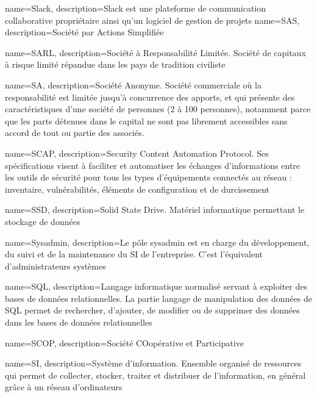 {
    name=Slack,
    description={Slack est une plateforme de communication collaborative propriétaire ainsi qu'un logiciel de gestion de projets}
}
{
    name=SAS,
    description={Société par Actions Simplifiée}
}

{
    name=SARL,
    description={Société à Responsabilité Limitée. Société de capitaux à risque limité répandue dans les pays de tradition civiliste}
}

{
    name=SA,
    description={Société Anonyme. Société commerciale où la responsabilité est limitée jusqu'à concurrence des apports, et qui présente des caractéristiques d'une société de personnes (2 à 100 personnes), notamment parce que les parts détenues dans le capital ne sont pas librement accessibles sans accord de tout ou partie des associés. }
}

{
    name=SCAP,
    description={Security Content Automation Protocol. Ses spécifications visent à faciliter et automatiser les échanges d'informations entre les outils de sécurité pour tous les types d'équipements connectés au réseau : inventaire, vulnérabilités, éléments de configuration et de durcissement}
}

{
    name=SSD,
    description={Solid State Drive. Matériel informatique permettant le stockage de données}
}

{
    name=Sysadmin,
    description={Le pôle sysadmin est en charge du développement, du suivi et de la maintenance du SI de l'entreprise. C'est l'équivalent d'administrateurs systèmes}
}

{
    name=SQL,
    description={Langage informatique normalisé servant à exploiter des bases de données relationnelles. La partie langage de manipulation des données de SQL permet de rechercher, d'ajouter, de modifier ou de supprimer des données dans les bases de données relationnelles}
}

{
    name=SCOP,
    description={Société COopérative et Participative}
}

{
    name=SI,
    description={Système d'information. Ensemble organisé de ressources qui permet de collecter, stocker, traiter et distribuer de l'information, en général grâce à un réseau d'ordinateurs}
}

